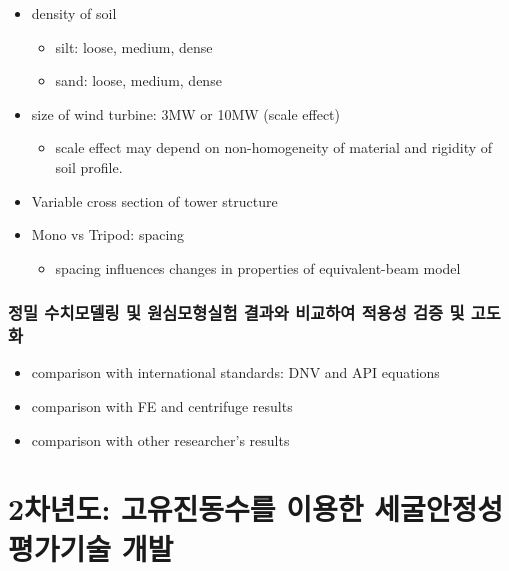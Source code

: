 \documentclass[
  letterpaper,
  DIV=11,
  numbers=noendperiod]{scrreprt}
\providecommand{\tightlist}{%
  \setlength{\itemsep}{0pt}\setlength{\parskip}{0pt}}\usepackage{longtable,booktabs,array}
\begin{document}
\begin{itemize}
\tightlist
\item
  density of soil

  \begin{itemize}
  \tightlist
  \item
    silt: loose, medium, dense
  \item
    sand: loose, medium, dense
  \end{itemize}
\item
  size of wind turbine: 3MW or 10MW (scale effect)

  \begin{itemize}
  \tightlist
  \item
    scale effect may depend on non-homogeneity of material and rigidity
    of soil profile.
  \end{itemize}
\item
  Variable cross section of tower structure
\item
  Mono vs Tripod: spacing

  \begin{itemize}
  \tightlist
  \item
    spacing influences changes in properties of equivalent-beam model
  \end{itemize}
\end{itemize}

\hypertarget{uxc815uxbc00-uxc218uxce58uxbaa8uxb378uxb9c1-uxbc0f-uxc6d0uxc2ecuxbaa8uxd615uxc2e4uxd5d8-uxacb0uxacfcuxc640-uxbe44uxad50uxd558uxc5ec-uxc801uxc6a9uxc131-uxac80uxc99d-uxbc0f-uxace0uxb3c4uxd654}{%
\subsubsection{정밀 수치모델링 및 원심모형실험 결과와 비교하여 적용성
검증 및
고도화}\label{uxc815uxbc00-uxc218uxce58uxbaa8uxb378uxb9c1-uxbc0f-uxc6d0uxc2ecuxbaa8uxd615uxc2e4uxd5d8-uxacb0uxacfcuxc640-uxbe44uxad50uxd558uxc5ec-uxc801uxc6a9uxc131-uxac80uxc99d-uxbc0f-uxace0uxb3c4uxd654}}

\begin{itemize}
\tightlist
\item
  comparison with international standards: DNV and API equations
\item
  comparison with FE and centrifuge results
\item
  comparison with other researcher's results
\end{itemize}

\hypertarget{uxcc28uxb144uxb3c4-uxace0uxc720uxc9c4uxb3d9uxc218uxb97c-uxc774uxc6a9uxd55c-uxc138uxad74uxc548uxc815uxc131-uxd3c9uxac00uxae30uxc220-uxac1cuxbc1c}{%
\section{\texorpdfstring{\textbf{2차년도:} 고유진동수를 이용한
세굴안정성 평가기술
개발}{2차년도: 고유진동수를 이용한 세굴안정성 평가기술 개발}}\label{uxcc28uxb144uxb3c4-uxace0uxc720uxc9c4uxb3d9uxc218uxb97c-uxc774uxc6a9uxd55c-uxc138uxad74uxc548uxc815uxc131-uxd3c9uxac00uxae30uxc220-uxac1cuxbc1c}}
\end{document}
